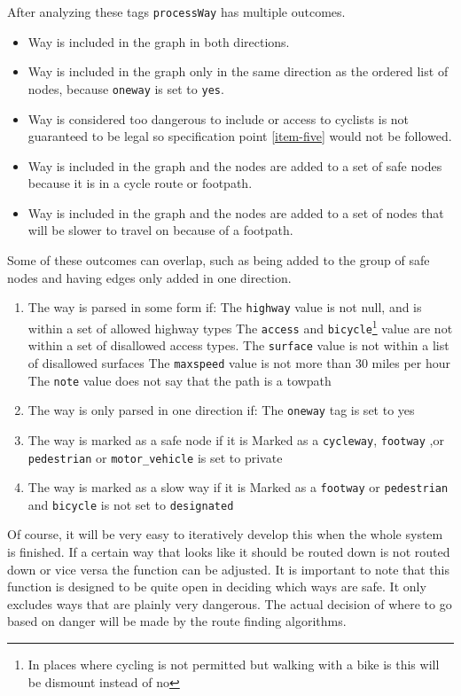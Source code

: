 \documentclass[11pt,twoside,a4paper]{report}
\begin{document}
After analyzing these tags \texttt{processWay} has multiple outcomes.
\begin{itemize}
    \item Way is included in the graph in both directions.
    \item Way is included in the graph only in the same direction as the ordered list of nodes, because \texttt{oneway} is set to \texttt{yes}.
    \item Way is considered too dangerous to include or access to cyclists is not guaranteed to be legal so specification point \ref{item-five} would not be followed.
    \item Way is included in the graph and the nodes are added to a set of safe nodes because it is in a cycle route or footpath.
    \item Way is included in the graph and the nodes are added to a set of nodes that will be slower to travel on because of a footpath.
\end{itemize}
Some of these outcomes can overlap, such as being added to the group of safe nodes and having edges only added in one direction.\\
\begin{enumerate}
    \item The way is parsed in some form if:
    \subitem The \texttt{highway} value is not null, and is within a set of allowed highway types
    \subitem The \texttt{access} and \texttt{bicycle}\footnote{In places where cycling is not permitted but walking with a bike is this will be dismount instead of no} value are not within a set of disallowed access types.
    \subitem The \texttt{surface} value is not within a list of disallowed surfaces
    \subitem The \texttt{maxspeed} value is not more than 30 miles per hour
    \subitem The \texttt{note} value does not say that the path is a towpath
    \item The way is only parsed in one direction if:
    \subitem The \texttt{oneway} tag is set to yes
    \item The way is marked as a safe node if it is
    \subitem Marked as a \texttt{cycleway}, \texttt{footway} ,or \texttt{pedestrian} or \texttt{motor\_vehicle} is set to private
    \item The way is marked as a slow way if it is 
    \subitem Marked as a \texttt{footway} or \texttt{pedestrian} and \texttt{bicycle} is not set to \texttt{designated}
\end{enumerate}
Of course, it will be very easy to iteratively develop this when the whole system is finished. If a certain way that looks like it should be routed down is not routed down or vice versa the function can be adjusted.
It is important to note that this function is designed to be quite open in deciding which ways are safe. It only excludes ways that are plainly very dangerous. The actual decision of where to go based on danger will be made by the
route finding algorithms.
\newpage
\end{document}
